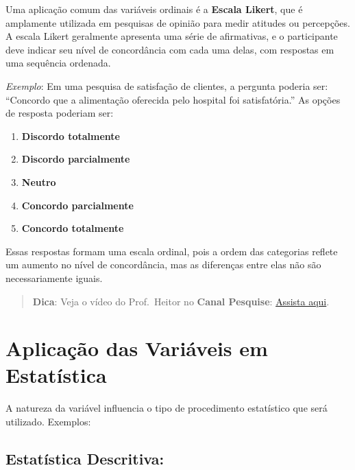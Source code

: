 \documentclass[
]{book}
\providecommand{\tightlist}{%
  \setlength{\itemsep}{0pt}\setlength{\parskip}{0pt}}
\begin{document}
Uma aplicação comum das variáveis ordinais é a \textbf{Escala Likert}, que é amplamente utilizada em pesquisas de opinião para medir atitudes ou percepções. A escala Likert geralmente apresenta uma série de afirmativas, e o participante deve indicar seu nível de concordância com cada uma delas, com respostas em uma sequência ordenada.

\emph{Exemplo}: Em uma pesquisa de satisfação de clientes, a pergunta poderia ser: ``Concordo que a alimentação oferecida pelo hospital foi satisfatória.'' As opções de resposta poderiam ser:

\begin{enumerate}
\def\labelenumi{\arabic{enumi}.}
\tightlist
\item
  \textbf{Discordo totalmente}
\item
  \textbf{Discordo parcialmente}
\item
  \textbf{Neutro}
\item
  \textbf{Concordo parcialmente}
\item
  \textbf{Concordo totalmente}
\end{enumerate}

Essas respostas formam uma escala ordinal, pois a ordem das categorias reflete um aumento no nível de concordância, mas as diferenças entre elas não são necessariamente iguais.

\begin{quote}
\textbf{Dica}: Veja o vídeo do Prof.~Heitor no \textbf{Canal Pesquise}: \href{https://youtu.be/_oc37Ea_tl8}{Assista aqui}.
\end{quote}

\section{Aplicação das Variáveis em Estatística}\label{aplicauxe7uxe3o-das-variuxe1veis-em-estatuxedstica}

A natureza da variável influencia o tipo de procedimento estatístico que será utilizado. Exemplos:

\subsection{Estatística Descritiva:}\label{estatuxedstica-descritiva-1}
\end{document}

